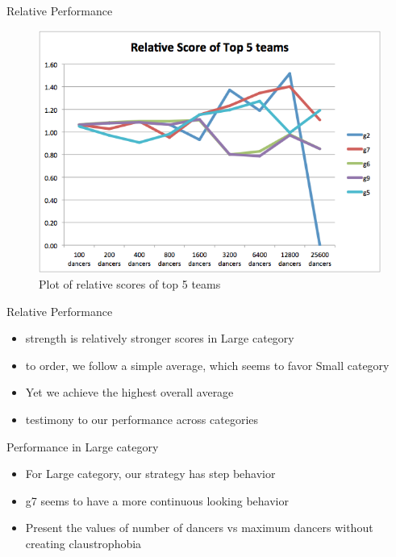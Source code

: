 \begin{frame}{Relative Performance}

\begin{figure}[htbp]
\centering
\includegraphics{imgs/team-5-rel.png}
\caption{Plot of relative scores of top 5 teams\label{team-5-rel}}
\end{figure}

\end{frame}

\begin{frame}{Relative Performance}

\begin{itemize}
\tightlist
\item
  strength is relatively stronger scores in Large category
\item
  to order, we follow a simple average, which seems to favor Small
  category
\item
  Yet we achieve the highest overall average
\item
  testimony to our performance across categories
\end{itemize}

\end{frame}

\begin{frame}{Performance in Large category}

\begin{itemize}
\tightlist
\item
  For Large category, our strategy has step behavior
\item
  g7 seems to have a more continuous looking behavior
\item
  Present the values of number of dancers vs maximum dancers without
  creating claustrophobia
\end{itemize}

\end{frame}
